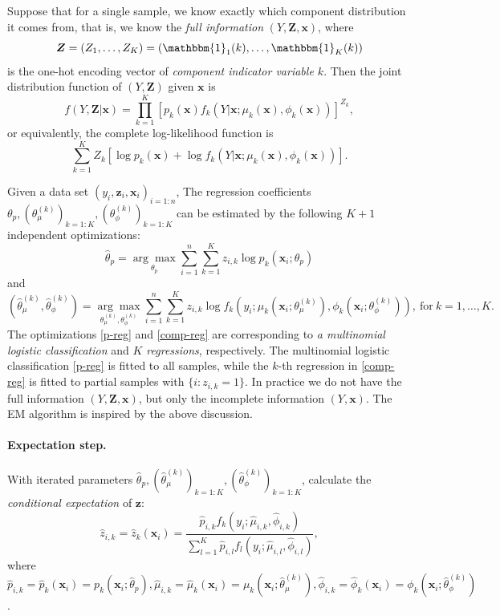 \documentclass[11pt]{article}
\numberwithin{equation}{section}
\def\bx{\boldsymbol{x}}
\def\bZ{\boldsymbol{Z}}
\def\bz{\boldsymbol{z}}
\begin{document}
	Suppose that for a single sample, we know exactly which component distribution it comes from, that is, we know the \textit{full information} $(Y,\bZ,\bx)$, where
	$$\bZ=(Z_1,\ldots,Z_K)=(\mathbbm{1}_1(k),\ldots,\mathbbm{1}_K(k))$$
	is the one-hot encoding vector of \textit{component indicator variable $k$}.
	Then the joint distribution function of $(Y,\bZ)$ given $\bx$ is
	$$f(Y,\bZ|
	\bx) = \prod_{k=1}^K\left[p_k(\bx)f_k(Y|\bx;\mu_k(\bx),\phi_k(\bx))\right]^{Z_k},$$
	or equivalently, the {complete log-likelihood function} is 
	\begin{equation}\label{full-L}
		\sum_{k=1}^K Z_k\left[\log p_k(\bx) + \log f_k(Y|\bx;\mu_k(\bx),\phi_k(\bx))\right].
	\end{equation}

	 
	 Given a data set $(y_i,\bz_i,\bx_i)_{i=1:n}$, 
	 The regression coefficients $\theta_p, (\theta_\mu^{(k)})_{k=1:K}, (\theta_\phi^{(k)})_{k=1:K}$ can be estimated by the following $K+1$ {independent optimizations:}
	\begin{equation}\label{p-reg}
		\hat{\theta}_p=\underset{\theta_p}{\arg\max}\sum_{i=1}^n\sum_{k=1}^Kz_{i,k}\log p_k(\bx_i;\theta_p)
	\end{equation}
and
	\begin{equation}\label{comp-reg}
		\left(\hat{\theta}_\mu^{(k)},\hat{\theta}_\phi^{(k)}\right)=\underset{\theta^{(k)}_\mu,\theta^{(k)}_\phi}{\arg\max}\sum_{i=1}^n\sum_{k=1}^Kz_{i,k}\log f_k\left(y_i;\mu_k\left(\bx_i;\theta_\mu^{(k)}\right),\phi_k\left(\bx_i;\theta_\phi^{(k)}\right)\right), ~\text{for} ~ k=1,\ldots,K.
	\end{equation}
	The optimizations \eqref{p-reg} and \eqref{comp-reg} are corresponding to  {\it a multinomial logistic classification} and {\it $K$ regressions}, respectively.
The multinomial logistic classification \eqref{p-reg} is fitted to all samples, while the $k$-th regression in \eqref{comp-reg} is fitted to {partial} samples with $\{i:z_{i,k}=1\}$.
In practice we do not have the full information  $(Y,\bZ,\bx)$, but only the incomplete information $(Y,\bx)$. The EM algorithm is inspired by the above discussion.
\paragraph{Expectation step.}
	With iterated parameters $\hat{\theta}_p, (\hat{\theta}_\mu^{(k)})_{k=1:K}, (\hat{\theta}_\phi^{(k)})_{k=1:K}$, calculate the \textit{conditional expectation} of $\bz$:
	$$\hat{z}_{i,k}=\hat{z}_k(\bx_i)=\frac{\hat{p}_{i,k}f_k(y_i;\hat{\mu}_{i,k},\hat{\phi}_{i,k})}{\sum_{l=1}^K\hat{p}_{i,l}f_l(y_i;\hat{\mu}_{i,l},\hat{\phi}_{i,l})},$$
	where
	$\hat{p}_{i,k}=\hat{p}_k(\bx_i)= p_k(\bx_i;\hat{\theta}_p),\hat{\mu}_{i,k}=\hat{\mu}_k(\bx_i)=\mu_k\left(\bx_i;\hat{\theta}_\mu^{(k)}\right),\hat{\phi}_{i,k}=\hat{\phi}_k(\bx_i)=\phi_k\left(\bx_i;\hat{\theta}_\phi^{(k)}\right)$.
\end{document}
